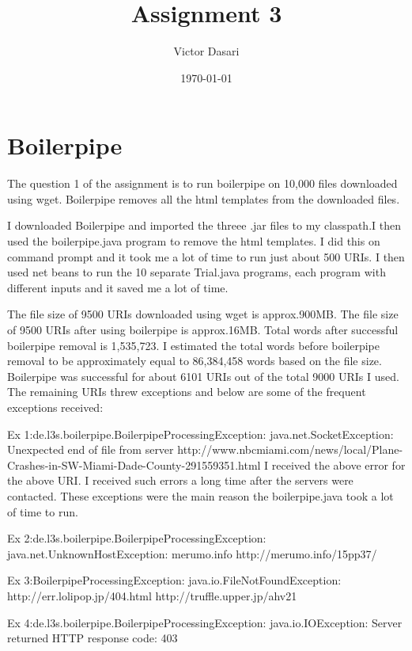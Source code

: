 \documentclass[12pt]{article} %
\title{Assignment 3}
\author{Victor Dasari} %
\date{\normalsize\today}
\begin{document}
\newpage



\section{Boilerpipe}


The question 1 of the assignment is to run boilerpipe on 10,000 files downloaded using wget. Boilerpipe removes all the html templates from the downloaded files.

I downloaded Boilerpipe and imported the threee .jar files to my classpath.I then used the boilerpipe.java program to remove the html templates. I did this on command prompt and it took me a lot of time to run just about 500 URIs. I then used net beans to run the 10 separate Trial.java programs, each program with different inputs and it saved me a lot of time.

The file size of 9500 URIs downloaded using wget is approx.900MB. The file size of 9500 URIs after using boilerpipe is approx.16MB. Total words after successful boilerpipe removal is 1,535,723. I estimated the total words before boilerpipe removal to be approximately equal to 86,384,458 words based on the file size.
Boilerpipe was successful for about 6101 URIs out of the total 9000 URIs I used. The remaining URIs threw exceptions and below are some of the frequent exceptions received:

Ex 1:de.l3s.boilerpipe.BoilerpipeProcessingException: java.net.SocketException: Unexpected end of file from server
http://www.nbcmiami.com/news/local/Plane-Crashes-in-SW-Miami-Dade-County-291559351.html
I received the above error for the above URI. I received such errors a long time after the servers were contacted. These exceptions were the main reason the boilerpipe.java took a lot of time to run.\cite{boilerpipe}

Ex 2:de.l3s.boilerpipe.BoilerpipeProcessingException: java.net.UnknownHostException:
merumo.info
http://merumo.info/15pp37/

Ex 3:BoilerpipeProcessingException: java.io.FileNotFoundException: http://err.lolipop.jp/404.html
http://truffle.upper.jp/ahv21

Ex 4:de.l3s.boilerpipe.BoilerpipeProcessingException: java.io.IOException: Server returned HTTP response code: 403 
\end{document}

